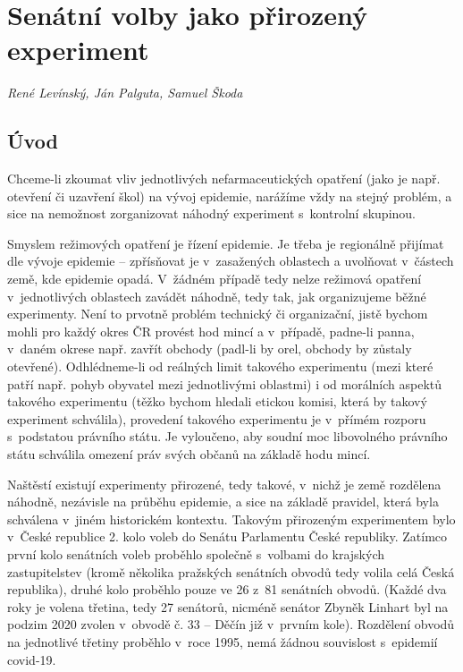 
\chapter{Senátní volby jako přirozený experiment}\label{Prirozene_experimenty}

\textit{René Levínský, Ján Palguta, Samuel Škoda}

\section*{Úvod}
Chceme-li zkoumat vliv jednotlivých nefarmaceutických opatření (jako je např. otev\-ře\-ní či uzavření škol) na vývoj epidemie, narážíme vždy na stejný problém, a sice na nemožnost zorganizovat náhodný experiment s~kontrolní skupinou. 

Smyslem režimových opatření je řízení epidemie. Je třeba je regionálně přijímat dle vývoje epidemie -- zpřísňovat je v~zasažených oblastech a uvolňovat v~částech země, kde epidemie opadá. V~žádném případě tedy nelze režimová opatření v~jednotlivých oblastech zavádět náhodně, tedy tak, jak organizujeme běžné experimenty. Není to prvotně problém technický či organizační, jistě bychom mohli pro každý okres ČR provést hod mincí a v~případě, padne-li panna, v~daném okrese např. zavřít obchody (padl-li by orel, obchody by zůstaly otevřené). Odhlédneme-li od reálných limit takového experimentu (mezi které patří např. pohyb obyvatel mezi jednotlivými oblastmi) i od morálních aspektů takového experimentu (těžko bychom hledali etickou komisi, která by takový experiment schválila), provedení takového experimentu je v~přímém rozporu s~podstatou právního státu. Je vyloučeno, aby soudní moc libovolného právního státu schválila omezení práv svých občanů na základě hodu mincí.

Naštěstí existují experimenty přirozené, tedy takové, v~nichž je země rozdělena náhodně, nezávisle na průběhu epidemie, a sice na základě pravidel, která byla schválena v~jiném historickém kontextu. Takovým přirozeným experimentem bylo v~České republice 2. kolo voleb do Senátu Parlamentu České republiky. Zatímco první kolo senátních voleb proběhlo společně s~volbami do krajských zastupitelstev (kromě několika pražských senátních obvodů tedy volila celá Česká republika), druhé kolo proběhlo pouze ve 26 z~81 senátních obvodů. (Každé dva roky je volena třetina, tedy 27 senátorů, nicméně senátor Zbyněk Linhart byl na podzim 2020 zvolen v~obvodě č. 33 -- Děčín již v~prvním kole). Rozdělení obvodů na jednotlivé třetiny 
proběhlo v~roce 1995, nemá žádnou souvislost s~epidemií covid-19. 


